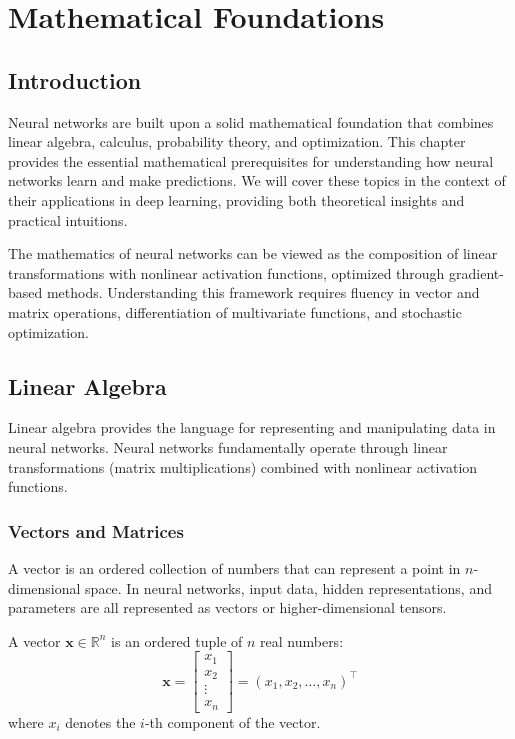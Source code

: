 ﻿\clearpage
\cleardoublepage

\chapter{Mathematical Foundations}

\section{Introduction}

Neural networks are built upon a solid mathematical foundation that combines linear algebra, calculus, probability theory, and optimization. This chapter provides the essential mathematical prerequisites for understanding how neural networks learn and make predictions. We will cover these topics in the context of their applications in deep learning, providing both theoretical insights and practical intuitions.

The mathematics of neural networks can be viewed as the composition of linear transformations with nonlinear activation functions, optimized through gradient-based methods. Understanding this framework requires fluency in vector and matrix operations, differentiation of multivariate functions, and stochastic optimization.

\section{Linear Algebra}

Linear algebra provides the language for representing and manipulating data in neural networks. Neural networks fundamentally operate through linear transformations (matrix multiplications) combined with nonlinear activation functions.

\subsection{Vectors and Matrices}

A vector is an ordered collection of numbers that can represent a point in $n$-dimensional space. In neural networks, input data, hidden representations, and parameters are all represented as vectors or higher-dimensional tensors.

\begin{definition}[Vector]
A vector $\mathbf{x} \in \mathbb{R}^n$ is an ordered tuple of $n$ real numbers:
\begin{equation}
\mathbf{x} = \begin{bmatrix} x_1 \\ x_2 \\ \vdots \\ x_n \end{bmatrix} = (x_1, x_2, \ldots, x_n)^\top
\end{equation}
where $x_i$ denotes the $i$-th component of the vector.
\end{definition}

